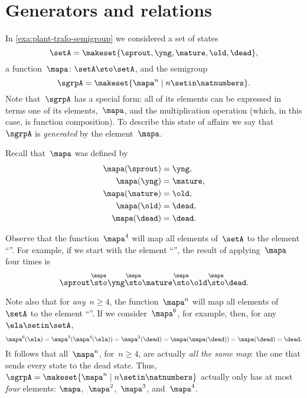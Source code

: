 
\section{Generators and relations}

In \cref{exa:plant-trafo-semigroup} we considered a set of states
%
\begin{equation}
    \setA= \makeset{ \sprout, \yng, \mature, \old, \dead },
\end{equation}
%
a function~$\mapa \colon \setA \sto \setA$, and the semigroup
%
\begin{equation}
    \label{eq:trafo-sgrp-one-gen}
    \sgrpA = \makeset{ \mapa^n \mid n \setin \natnumbers }.
\end{equation}
%
Note that~$\sgrpA$ has a special form: all of its elements can be expressed in terms one of its elements,~$\mapa$, and the multiplication operation (which, in this case, is function composition).
To describe this state of affairs we say that~$\sgrpA$ is \emph{generated} by the element~$\mapa$.

Recall that~$\mapa$ was defined by
%
\begin{align*}
    \mapa(\sprout) & =  \yng, \\
    \mapa(\yng)    & =  \mature, \\
    \mapa(\mature) & =  \old, \\
    \mapa( \old)   & = \dead, \\
    \mapa(\dead)   & = \dead.
\end{align*}

Observe that the function~$\mapa^4$ will map all elements of~$\setA$ to the element ``\dead''.
For example, if we start with the element ``\sprout'', the result of applying~$\mapa$ four times is
%
\begin{equation*}
    \sprout \overset{\mapa}{\sto} \yng \overset{\mapa}{\sto} \mature \overset{\mapa}{\sto} \old \overset{\mapa}{\sto} \dead.
\end{equation*}

Note also that for \emph{any}~$n \geq 4$, the function~$\mapa^n$ will map all elements of~$\setA$ to the element ``\dead''.
If we consider~$\mapa^6$, for example, then, for any~$\ela \setin \setA$,
%
\begin{equation*}
    \mapa^6(\ela) = \mapa^2(\mapa^4(\ela)) = \mapa^2(\dead) = \mapa(\mapa(\dead)) = \mapa(\dead) = \dead.
\end{equation*}
%
It follows that all~$\mapa^n$, for~$n \geq 4$, are actually \emph{all the same map}: the one that sends every state to the dead state.
Thus, ~$\sgrpA = \makeset{ \mapa^n \mid n \setin \natnumbers }$ actually only has at most \emph{four} elements: $\mapa$,~$\mapa^2$,~$\mapa^3$, and~$\mapa^4$.

